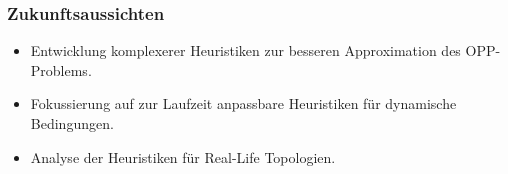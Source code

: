 \documentclass{beamer}
\begin{document}
\begin{frame}
\frametitle{Zukunftsaussichten}
\begin{itemize}
    \item Entwicklung komplexerer Heuristiken zur besseren Approximation des OPP-Problems.
    \item Fokussierung auf zur Laufzeit anpassbare Heuristiken für dynamische Bedingungen.
    \item Analyse der Heuristiken für Real-Life Topologien.
\end{itemize}
\end{frame}
\end{document}
